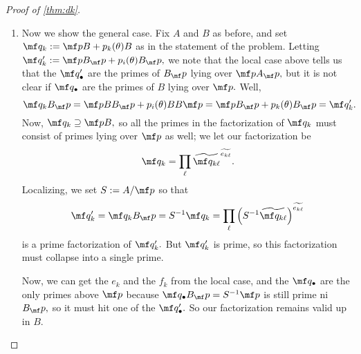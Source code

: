 \documentclass[../notes.tex]{subfiles}
\begin{document}
\begin{proof}[Proof of \autoref{thm:dk}]
\begin{enumerate}
		\item Now we show the general case. Fix $A$ and $B$ as before, and set $\mf q_k:=\mf pB+p_k(\theta)B$ as in the statement of the problem. Letting $\mf q_k':=\mf pB_\mf p+p_i(\theta)B_\mf p,$ we note that the local case above tells us that the $\mf q_\bullet'$ are the primes of $B_\mf p$ lying over $\mf pA_\mf p,$ but it is not clear if $\mf q_\bullet$ are the primes of $B$ lying over $\mf p.$ Well,
		\[\mf q_kB_\mf p=\mf pBB_\mf p+p_i(\theta)BB\mf p=\mf pB_\mf p+p_k(\theta)B_\mf p=\mf q_k'.\]
		Now, $\mf q_k\supseteq\mf pB,$ so all the primes in the factorization of $\mf q_k$ must consist of primes lying over $\mf p$ as well; we let our factorization be
		\[\mf q_k=\prod_\ell\widetilde{\mf q_{k\ell}}^{\widetilde{e_{k\ell}}}.\]
		Localizing, we set $S:=A/\mf p$ so that
		\[\mf q_k'=\mf q_kB_\mf p=S^{-1}\mf q_k=\prod_\ell\left(S^{-1}\widetilde{\mf q_{k\ell}}\right)^{\widetilde{e_{k\ell}}}\]
		is a prime factorization of $\mf q_k'.$ But $\mf q_k'$ is prime, so this factorization must collapse into a single prime.

		Now, we can get the $e_k$ and the $f_k$ from the local case, and the $\mf q_\bullet$ are the only primes above $\mf p$ because $\mf q_\bullet B_\mf p=S^{-1}\mf p$ is still prime ni $B_\mf p,$ so it must hit one of the $\mf q_\bullet'.$ So our factorization remains valid up in $B.$
		\qedhere
	\end{enumerate}
\end{proof}
\end{document}
